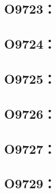 \subsection{O9723：}



\clearpage
\subsection{O9724：}



\clearpage
\subsection{O9725：}



\clearpage
\subsection{O9726：}



\clearpage
\subsection{O9727：}



\clearpage
\subsection{O9729：}



